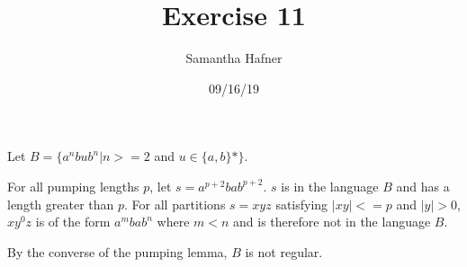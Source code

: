 \documentclass[12pt]{article}
\title{Exercise 11}
\author{Samantha Hafner}
\date{09/16/19}
\begin{document}
\maketitle

Let $B=\{a^nbub^n | n>=2$ and $u \in \{a,b\}\mbox{*}\}$.

For all pumping lengths $p$, let $s = a^{p+2} b a b^{p+2}$. $s$ is in the language $B$ and has a length greater than $p$. For all partitions $s = xyz$ satisfying $|xy| <= p$ and $|y| > 0$, $xy^0z$ is of the form $a^mbab^n$ where $m < n$ and is therefore not in the language $B$.

By the converse of the pumping lemma, $B$ is not regular.
  
\end{document}
